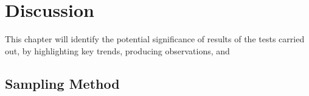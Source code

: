 \section{Discussion}
This chapter will identify the potential significance of results of the tests carried out, by highlighting key trends, producing observations, and 

\subsection{Sampling Method}

